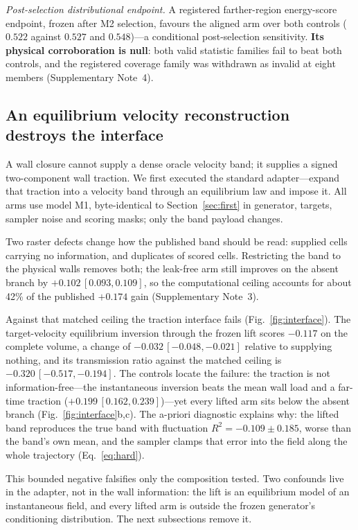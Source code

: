 \emph{Post-selection distributional endpoint.} A registered farther-region energy-score
endpoint, frozen after M2 selection, favours the aligned arm over both controls ($0.522$
against $0.527$ and $0.548$)---a conditional post-selection sensitivity. \textbf{Its physical
corroboration is null}: both valid statistic families fail to beat both controls, and the
registered coverage family was withdrawn as invalid at eight members (Supplementary Note~4).

\subsection{An equilibrium velocity reconstruction destroys the interface}
\label{sec:interface}

A wall closure cannot supply a dense oracle velocity band; it supplies a signed two-component
wall traction. We first executed the standard adapter---expand that traction into a velocity band
through an equilibrium law and impose it. All arms use model M1, byte-identical to
Section~\ref{sec:first} in generator, targets, sampler noise and scoring masks; only the band
payload changes.

Two raster defects change how the published band should be read: supplied cells carrying no
information, and duplicates of scored cells. Restricting the band to the physical walls
removes both; the leak-free arm still improves on the absent branch by
$+0.102\,[0.093,0.109]$, so the computational ceiling accounts for about
42\% of the published $+0.174$ gain (Supplementary Note~3).

Against that matched ceiling the traction interface fails (Fig.~\ref{fig:interface}). The
target-velocity equilibrium inversion through the frozen lift scores $-0.117$ on the complete
volume, a change of $-0.032\,[-0.048,-0.021]$ relative to supplying nothing, and its transmission
ratio against the matched ceiling is $-0.320\,[-0.517,-0.194]$. The controls locate the failure: the traction is not information-free---the instantaneous
inversion beats the mean wall load and a far-time traction ($+0.199\,[0.162,0.239]$)---yet every
lifted arm sits below the absent branch (Fig.~\ref{fig:interface}b,c). The a-priori diagnostic explains why: the lifted
band reproduces the true band with fluctuation
$R^2=-0.109\pm0.185$, worse than the band's own mean, and the sampler clamps that error into the
field along the whole trajectory (Eq.~\eqref{eq:hard}).

This bounded negative falsifies only the composition tested. Two confounds live in the adapter,
not in the wall information: the lift is an equilibrium model of an instantaneous field, and
every lifted arm is outside the frozen generator's conditioning distribution. The next
subsections remove it.

